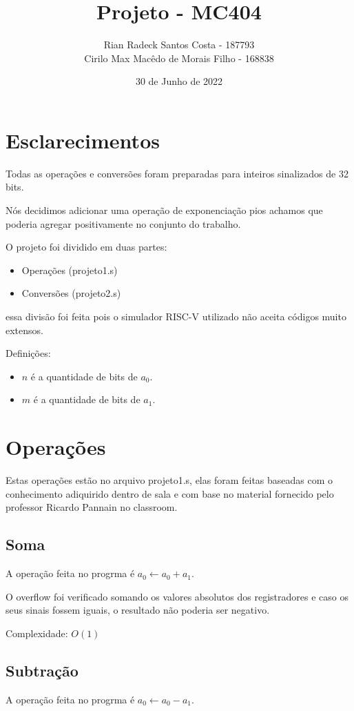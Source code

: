 \documentclass[12pt, letterpaper]{article}
\title{Projeto - MC404}
\author{Rian Radeck Santos Costa - 187793 \\ Cirilo Max Macêdo de Morais Filho - 168838}
\date{30 de Junho de 2022}
\begin{document}
\maketitle
\newpage
\tableofcontents
\newpage

\section{Esclarecimentos}
	Todas as operações e conversões foram preparadas para inteiros sinalizados de 32 bits.

	Nós decidimos adicionar uma operação de exponenciação pios achamos que poderia agregar positivamente no conjunto do trabalho.

	O projeto foi dividido em duas partes:
	\begin{itemize}
		\item{Operações  (projeto1.s)}
		\item{Conversões (projeto2.s)}
	\end{itemize}
	essa divisão foi feita pois o simulador RISC-V utilizado não aceita códigos muito extensos.

	Definições:
	\begin{itemize}
		\item{$n$ é a quantidade de bits de $a_0$.}
		\item{$m$ é a quantidade de bits de $a_1$.}
	\end{itemize}

\newpage
\section{Operações}
	Estas operações estão no arquivo projeto1.s, elas foram feitas baseadas com o conhecimento adiquirido dentro de sala e com base no material fornecido pelo professor Ricardo Pannain no classroom.
	\subsection{Soma}
		A operação feita no progrma é $a_0 \leftarrow a_0 + a_1$.

		O overflow foi verificado somando os valores absolutos dos registradores e caso os seus sinais fossem iguais, o resultado não poderia ser negativo.

		Complexidade: $O(1)$
	\subsection{Subtração}
		A operação feita no progrma é $a_0 \leftarrow a_0 - a_1$.
\end{document}
